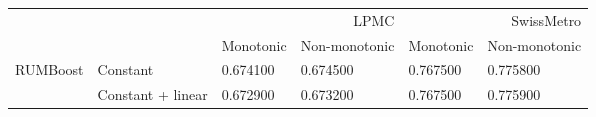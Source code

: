 \begin{tabular}{llllll}
\toprule
 &  & \multicolumn{2}{r}{LPMC} & \multicolumn{2}{r}{SwissMetro} \\
 &  & Monotonic & Non-monotonic & Monotonic & Non-monotonic \\
\midrule
\multirow[t]{2}{*}{RUMBoost} & Constant & 0.674100 & 0.674500 & 0.767500 & 0.775800 \\
 & Constant + linear & 0.672900 & 0.673200 & 0.767500 & 0.775900 \\
\cline{1-6}
\bottomrule
\end{tabular}
